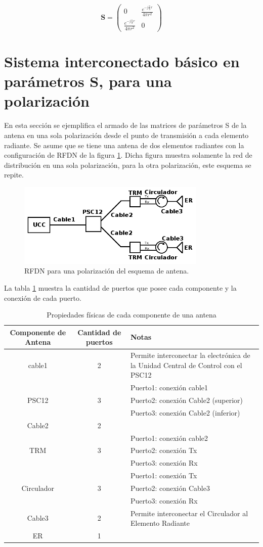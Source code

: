 $$
\mathbf{S} = \begin{pmatrix} 0 & \frac{e^{-j\frac{\pi}{\lambda}r}}{4\pi r^2}\\\frac{e^{-j\frac{\pi}{\lambda}r}}{4\pi r^2} & 0\end{pmatrix}
$$

\section{Sistema interconectado básico en parámetros S, para una polarización}

En esta sección se ejemplifica el armado de las matrices de parámetros S de la antena en una sola polarización desde el punto 
de transmisión a cada elemento radiante. Se asume que se tiene una antena de dos elementos radiantes con la configuración de 
RFDN de la figura \ref{fig:antennaS}. Dicha figura muestra solamente la red de distribución en una sola polarización, para la 
otra polarización, este esquema se repite.

\begin{figure}[H]
 \centering
 \includegraphics[width=9cm]{gfx/RFDN.png}
 \caption{RFDN para una polarización del esquema de antena.}
 \label{fig:antennaS}
\end{figure}

La tabla \ref{tab:componentSParameters} muestra la cantidad de puertos que posee cada componente y la conexión de cada puerto.

\begin{table}[H]
  \footnotesize
  \centering
  \begin{tabular}{|c|c|p{6cm}|}
	\hline
	\textbf{Componente de Antena} & \textbf{Cantidad de puertos} & \textbf{Notas} \tabularnewline \hline
	cable1 &  2 & Permite interconectar la electrónica de la Unidad Central de Control con el PSC12 \tabularnewline \hline
	\multirow{3}{*}{PSC12} & & Puerto1: conexión cable1 \tabularnewline
	 & 3 & Puerto2: conexión Cable2 (superior) \tabularnewline
	 & & Puerto3: conexión Cable2 (inferior) \tabularnewline \hline
	Cable2 & 2 & \tabularnewline \hline
	\multirow{3}{*}{TRM} & & Puerto1: conexión cable2 \tabularnewline
	 & 3 & Puerto2: conexión Tx \tabularnewline
	 & & Puerto3: conexión Rx \tabularnewline \hline
	\multirow{3}{*}{Circulador} & & Puerto1: conexión Tx \tabularnewline
	 & 3 & Puerto2: conexión Cable3 \tabularnewline
	 & & Puerto3: conexión Rx \tabularnewline \hline
	Cable3 & 2 & Permite interconectar el Circulador al Elemento Radiante \tabularnewline \hline
	ER & 1 &   \tabularnewline \hline
  \end{tabular}
  \caption{Propiedades físicas de cada componente de una antena}
  \label{tab:componentSParameters}
\end{table}

